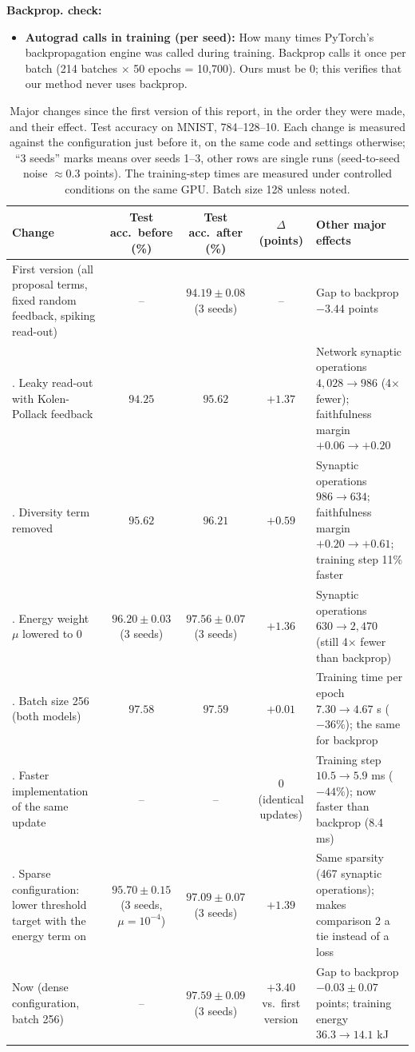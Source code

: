 \documentclass{article}
\begin{document}
{\noindent\textbf{Backprop. check:}
\begin{itemize}
  \item \textbf{Autograd calls in training (per seed):} How many times PyTorch's backpropagation engine was called during training. Backprop calls it once per batch (214 batches $\times$ 50 epochs = 10,700). Ours must be 0; this verifies that our method never uses backprop.
\end{itemize}
}

\begin{table}[H]
\centering
\small
\setlength{\tabcolsep}{4pt}
\caption{Major changes since the first version of this report, in the order they were made, and their effect. Test accuracy on MNIST, 784--128--10. Each change is measured against the configuration just before it, on the same code and settings otherwise; ``3 seeds'' marks means over seeds 1--3, other rows are single runs (seed-to-seed noise $\approx 0.3$ points). The training-step times are measured under controlled conditions on the same GPU. Batch size 128 unless noted.}
\label{tab:changes}
\begin{tabular}{>{\raggedright\arraybackslash}p{4.3cm}ccc>{\raggedright\arraybackslash}p{4.4cm}}
\toprule
Change & Test acc.\ before (\%) & Test acc.\ after (\%) & $\Delta$ (points) & Other major effects \\
\midrule
First version (all proposal terms, fixed random feedback, spiking read-out) & -- & $94.19 \pm 0.08$ (3 seeds) & -- & Gap to backprop $-3.44$ points \\
\midrule
1. Leaky read-out with Kolen-Pollack feedback & $94.25$ & $95.62$ & $+1.37$ & Network synaptic operations $4{,}028 \to 986$ (4$\times$ fewer); faithfulness margin $+0.06 \to +0.20$ \\
2. Diversity term removed & $95.62$ & $96.21$ & $+0.59$ & Synaptic operations $986 \to 634$; faithfulness margin $+0.20 \to +0.61$; training step 11\% faster \\
3. Energy weight $\mu$ lowered to 0 & $96.20 \pm 0.03$ (3 seeds) & $97.56 \pm 0.07$ (3 seeds) & $+1.36$ & Synaptic operations $630 \to 2{,}470$ (still 4$\times$ fewer than backprop) \\
4. Batch size 256 (both models) & $97.58$ & $97.59$ & $+0.01$ & Training time per epoch $7.30 \to 4.67$ s ($-36\%$); the same for backprop \\
5. Faster implementation of the same update & -- & -- & $0$ (identical updates) & Training step $10.5 \to 5.9$ ms ($-44\%$); now faster than backprop (8.4 ms) \\
\midrule
6. Sparse configuration: lower threshold target with the energy term on & $95.70 \pm 0.15$ (3 seeds, $\mu = 10^{-4}$) & $97.09 \pm 0.07$ (3 seeds) & $+1.39$ & Same sparsity (467 synaptic operations); makes comparison 2 a tie instead of a loss \\
\midrule
Now (dense configuration, batch 256) & -- & $97.59 \pm 0.09$ (3 seeds) & $+3.40$ vs.\ first version & Gap to backprop $-0.03 \pm 0.07$ points; training energy $36.3 \to 14.1$ kJ \\
\bottomrule
\end{tabular}
\end{table}
\end{document}
